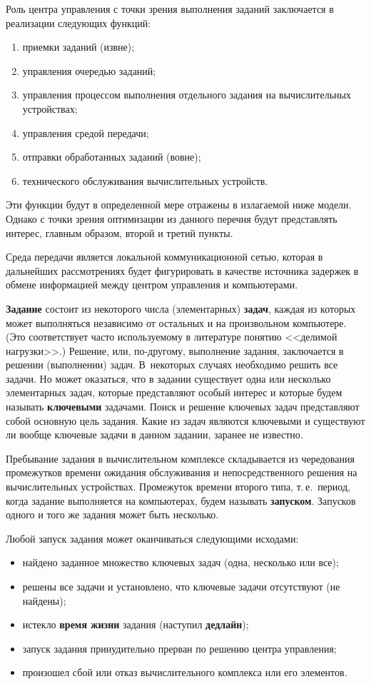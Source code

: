 \begin{multicols}{2}
   Роль центра управления с точки зрения выполнения заданий 
заключается в реализации сле\-ду\-ющих функций:
   \begin{enumerate}[(1)]
\item приемки заданий (извне);
\item управления очередью заданий;
\item управления процессом выполнения отдельного задания на 
вычислительных устройствах;
\item управления средой передачи;
\item отправки обработанных заданий (вовне);
\item технического обслуживания вычислительных устройств.
\end{enumerate}

   Эти функции будут в определенной мере отражены в излагаемой ниже 
модели. Однако с точки зрения оптимизации из данного перечня будут 
представлять интерес, главным образом, второй и третий пункты.
   
   Среда передачи является локальной коммуникационной сетью, которая в 
дальнейших рас\-смот\-ре\-ни\-ях будет фигурировать в качестве источника 
задержек в обмене информацией между центром управления и 
компьютерами.
   
   \textbf{Задание} состоит из некоторого числа (элементарных) 
\textbf{задач}, каждая из которых может выполняться независимо от 
остальных и на произвольном компьютере. (Это соответствует часто 
исполь\-зу\-емо\-му в литературе понятию <<делимой нагрузки>>.) Решение, 
или, по-дру\-го\-му, выполнение задания, заключается в решении 
(выполнении) задач. В~некоторых случаях необходимо решить все задачи. 
Но может оказаться, что в задании существует одна или несколько 
элементарных задач, которые пред\-став\-ля\-ют особый интерес и которые 
будем называть \textbf{ключевыми} задачами. Поиск и решение 
ключевых задач представляют собой основную цель задания. Какие из задач 
являются ключевыми и существуют ли вообще ключевые задачи в данном 
задании, заранее не известно.
   
   Пребывание задания в вычислительном комплексе складывается из 
чередования промежутков времени ожидания обслуживания и 
непосредственного решения на вычислительных устройствах. Промежуток 
времени второго типа, т.\,е.\ период, когда задание выполняется на 
компьютерах, будем называть \textbf{запуском}. Запусков одного и того 
же задания может быть несколько.
   
   Любой запуск задания может оканчиваться следующими исходами:
   \begin{itemize}
   \item найдено заданное множество ключевых задач (одна, несколько или 
все);
   \item решены все задачи и установлено, что ключевые задачи отсутствуют (не 
найдены);
\item истекло \textbf{время жизни} задания (наступил 
\textbf{дедлайн});
   \item запуск задания принудительно прерван по решению центра 
управления;
   \item произошел сбой или отказ вычислительного комплекса или его 
элементов.
   \end{itemize}
   

\end{multicols}
